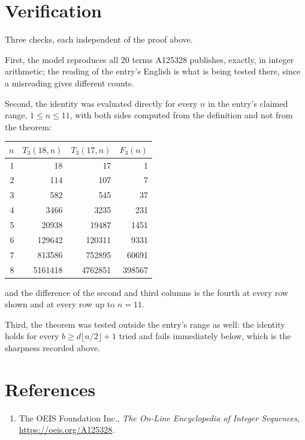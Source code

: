 \documentclass[11pt,a4paper]{article}
\theoremstyle{plain}
\theoremstyle{definition}
\begin{document}
\section{Verification}

Three checks, each independent of the proof above.

First, the model reproduces all $20$ terms A125328 publishes, exactly, in integer
arithmetic; the reading of the entry's English is what is being tested there, since a
misreading gives different counts.

Second, the identity was evaluated directly for every $n$ in the entry's claimed range,
$1\le n\le11$, with both sides computed from the definition and not from the theorem:

\begin{center}
\begin{tabular}{rrrr}
$n$ & $T_{3}(18,n)$ & $T_{3}(17,n)$ & $F_{3}(n)$ \\ \hline
1 & 18 & 17 & 1 \\
2 & 114 & 107 & 7 \\
3 & 582 & 545 & 37 \\
4 & 3466 & 3235 & 231 \\
5 & 20938 & 19487 & 1451 \\
6 & 129642 & 120311 & 9331 \\
7 & 813586 & 752895 & 60691 \\
8 & 5161418 & 4762851 & 398567 \\
\end{tabular}
\end{center}

\noindent and the difference of the second and third columns is the fourth at every row shown
and at every row up to $n=11$.

Third, the theorem was tested outside the entry's range as well: the identity holds for every
$b\ge d\lfloor n/2\rfloor+1$ tried and fails immediately below, which is the sharpness recorded
above.

\section*{References}
\begin{enumerate}
\item The OEIS Foundation Inc., \emph{The On-Line Encyclopedia of Integer Sequences},
\url{https://oeis.org/A125328}.
\end{enumerate}
\end{document}

